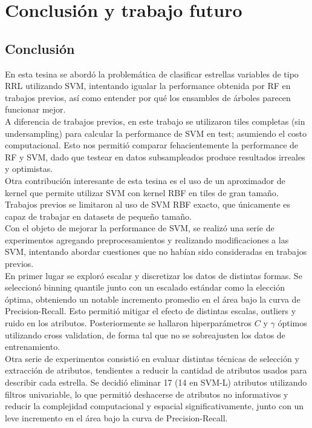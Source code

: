 \chapter{Conclusión y trabajo futuro}

\section{Conclusión}
En esta tesina se abordó la problemática de clasificar estrellas variables de tipo RRL utilizando SVM, intentando igualar la performance obtenida por RF en trabajos previos, así como entender por qué los ensambles de árboles parecen funcionar mejor. \\

A diferencia de trabajos previos, en este trabajo se utilizaron tiles completas (sin undersampling) para calcular la performance de SVM en test; asumiendo el costo computacional. Esto nos permitió comparar fehacientemente la performance de RF y SVM, dado que testear en datos subsampleados produce resultados irreales y optimistas. \\

Otra contribución interesante de esta tesina es el uso de un aproximador de kernel que permite utilizar SVM con kernel RBF en tiles de gran tamaño. Trabajos previos se limitaron al uso de SVM RBF exacto, que únicamente es capaz de trabajar en datasets de pequeño tamaño. \\

Con el objeto de mejorar la performance de SVM, se realizó una serie de experimentos agregando preprocesamientos y realizando modificaciones a las SVM, intentando abordar cuestiones que no habían sido consideradas en trabajos previos. \\

En primer lugar se exploró escalar y discretizar los datos de distintas formas. Se seleccionó binning quantile junto con un escalado estándar como la elección óptima, obteniendo un notable incremento promedio en el área bajo la curva de Precision-Recall. Esto permitió mitigar el efecto de distintas escalas, outliers y ruido en los atributos. Posteriormente se hallaron hiperparámetros $C$ y $\gamma$ óptimos utilizando cross validation, de forma tal que no se sobreajusten los datos de entrenamiento. \\

Otra serie de experimentos consistió en evaluar distintas técnicas de selección y extracción de atributos, tendientes a reducir la cantidad de atributos usados para describir cada estrella. Se decidió eliminar 17 (14 en SVM-L) atributos utilizando filtros univariable, lo que permitió deshacerse de atributos no informativos y reducir la complejidad computacional y espacial significativamente, junto con un leve incremento en el área bajo la curva de Precision-Recall. \\

